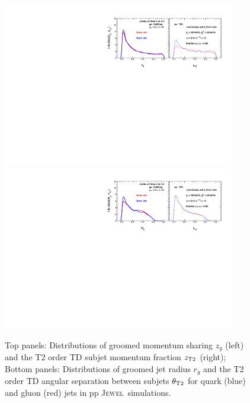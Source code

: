 \documentclass[notoc]{JHEP3}
\newcommand{\jw}{\textsc{Jewel}~}
\begin{document}
\begin{figure}[t]
	   \centering
	   \includegraphics[width=0.9\textwidth]{plots/Comp_zg_ppcomp_SD_TD2_new.pdf}
	   \includegraphics[width=0.9\textwidth]{plots/Comp_rg_ppcomp_SD_TD2_new.pdf}
	   \caption{Top panels: Distributions of groomed momentum sharing $z_g$ (left) and the T2 order TD subjet momentum fraction $z_{\rm T2}$ (right); Bottom panels: Distributions of groomed jet radius $r_g$ and the T2 order TD angular separation between subjets $\theta_{\rm T2}$ for quark (blue) and gluon (red) jets in pp \jw simulations.}
\label{fig:comp_z_pp_wT2}
\end{figure}
\end{document}
